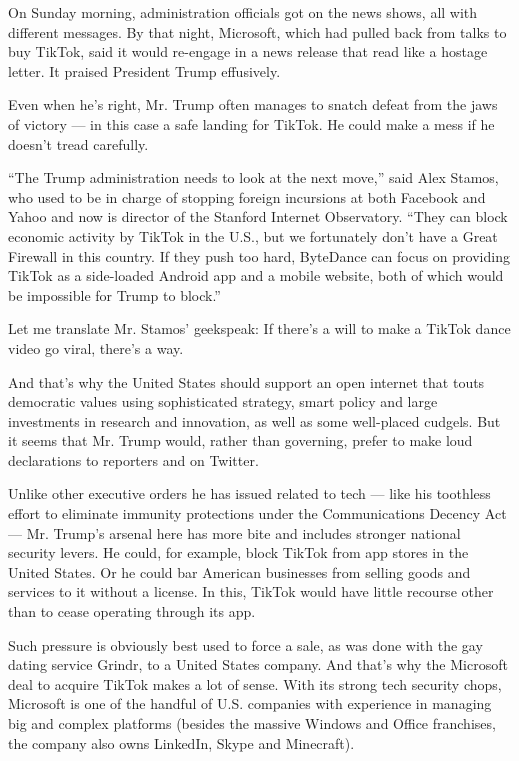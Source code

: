 On Sunday morning, administration officials got on the news shows, all
with different messages. By that night, Microsoft, which had pulled back
from talks to buy TikTok, said it would re-engage in a news release that
read like a hostage letter. It praised President Trump effusively.

Even when he's right, Mr. Trump often manages to snatch defeat from the
jaws of victory --- in this case a safe landing for TikTok. He could
make a mess if he doesn't tread carefully.

``The Trump administration needs to look at the next move,'' said Alex
Stamos, who used to be in charge of stopping foreign incursions at both
Facebook and Yahoo and now is director of the Stanford Internet
Observatory. ``They can block economic activity by TikTok in the U.S.,
but we fortunately don't have a Great Firewall in this country. If they
push too hard, ByteDance can focus on providing TikTok as a side-loaded
Android app and a mobile website, both of which would be impossible for
Trump to block.''

Let me translate Mr. Stamos' geekspeak: If there's a will to make a
TikTok dance video go viral, there's a way.

And that's why the United States should support an open internet that
touts democratic values using sophisticated strategy, smart policy and
large investments in research and innovation, as well as some
well-placed cudgels. But it seems that Mr. Trump would, rather than
governing, prefer to make loud declarations to reporters and on Twitter.

Unlike other executive orders he has issued related to tech --- like his
toothless effort to eliminate immunity protections under the
Communications Decency Act --- Mr. Trump's arsenal here has more bite
and includes stronger national security levers. He could, for example,
block TikTok from app stores in the United States. Or he could bar
American businesses from selling goods and services to it without a
license. In this, TikTok would have little recourse other than to cease
operating through its app.

Such pressure is obviously best used to force a sale, as was done with
the gay dating service Grindr, to a United States company. And that's
why the Microsoft deal to acquire TikTok makes a lot of sense. With its
strong tech security chops, Microsoft is one of the handful of U.S.
companies with experience in managing big and complex platforms (besides
the massive Windows and Office franchises, the company also owns
LinkedIn, Skype and Minecraft).

